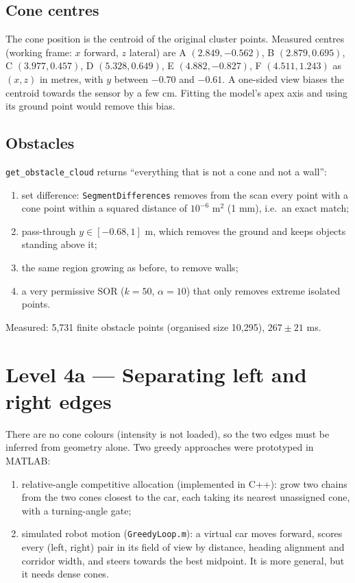 \documentclass[10pt,a4paper]{scrartcl}
\renewcommand{\emph}[1]{\textcolor{accent}{#1}}
\newcommand{\code}[1]{\texttt{#1}}
\newcommand{\file}[1]{\texttt{\small #1}}
\newcommand{\RuleSection}[1]{%
    \section{#1}%
    \vspace{0.2em}{\color{accent!35}\hrule height 0.4pt}\vspace{0.3em}%
  }
\begin{document}
  \subsection{Cone centres}

  The cone position is the centroid of the original cluster points. Measured centres
  (working frame: $x$ forward, $z$ lateral) are
  A $(2.849,-0.562)$, B $(2.879,0.695)$, C $(3.977,0.457)$, D $(5.328,0.649)$,
  E $(4.882,-0.827)$, F $(4.511,1.243)$ as $(x,z)$ in metres, with $y$ between $-0.70$
  and $-0.61$. A one-sided view biases the centroid towards the sensor by a few cm.
  Fitting the model's apex axis and using its ground point would remove this bias.

  \subsection{Obstacles}

  \code{get\_obstacle\_cloud} returns ``everything that is not a cone and not a wall'':
  \begin{enumerate}
    \item set difference: \code{SegmentDifferences} removes from the scan every point
      with a cone point within a \emph{squared} distance of $10^{-6}$ m$^2$ (1 mm), i.e.\
      an exact match;
    \item pass-through $y\in[-0.68,1]$ m, which removes the ground and keeps objects
      standing above it;
    \item the same region growing as before, to remove walls;
    \item a very permissive SOR ($k=50$, $\alpha=10$) that only removes extreme isolated
      points.
  \end{enumerate}
  \emph{Measured:} 5,731 finite obstacle points (organised size 10,295), $267\pm21$ ms.

  \RuleSection{Level 4a --- Separating left and right edges}
  \label{sec:l4a}

  There are no cone colours (intensity is not loaded), so the two edges must be
  inferred from geometry alone. Two greedy approaches were prototyped in MATLAB:
  \begin{enumerate}
    \item \emph{relative-angle competitive allocation} (implemented in C++): grow two
      chains from the two cones closest to the car, each taking its nearest unassigned
      cone, with a turning-angle gate;
    \item \emph{simulated robot motion} (\file{GreedyLoop.m}): a virtual car moves
      forward, scores every (left, right) pair in its field of view by distance, heading
      alignment and corridor width, and steers towards the best midpoint. It is more
      general, but it needs dense cones.
  \end{enumerate}
\end{document}
